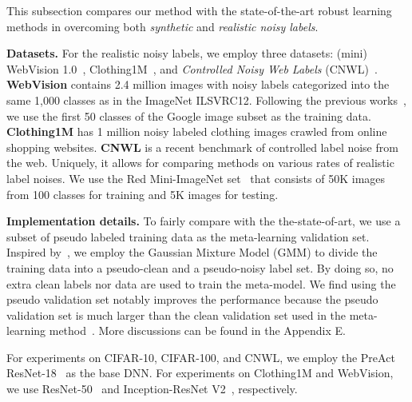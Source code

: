 \documentclass[final]{cvpr}
\begin{document}
This subsection compares our method with the state-of-the-art robust learning methods in overcoming both \textit{synthetic} and \textit{realistic noisy labels}.

\textbf{Datasets.} For the realistic noisy labels, we employ three datasets: (mini) WebVision 1.0~\cite{li2017webvision},  Clothing1M~\cite{xiao2015learning}, and \textit{Controlled Noisy Web Labels} (CNWL)~\cite{jiang2020beyond}. \textbf{WebVision} contains 2.4 million images with noisy labels categorized into the same 1,000 classes as in the ImageNet ILSVRC12. Following the previous works~\cite{jiang2017mentornet, chen2019understanding}, we use the first 50 classes of the Google image subset as the training data. 
\textbf{Clothing1M} has 1 million noisy labeled clothing images crawled from online shopping websites. \textbf{CNWL} is a recent benchmark of controlled label noise from the web. Uniquely, it allows for comparing methods on various rates of realistic label noises. We use the Red Mini-ImageNet set~\cite{vinyals2016matching} that consists of 50K images from 100 classes for training and 5K images for testing. 

\textbf{Implementation details.} To fairly compare with the the-state-of-art, we use a subset of pseudo labeled training data as the meta-learning validation set. Inspired by~\cite{li2020dividemix}, we employ the Gaussian Mixture Model (GMM) to divide the training data into a pseudo-clean and a pseudo-noisy label set. 
By doing so, no extra clean labels nor data are used to train the meta-model. We find using the pseudo validation set notably improves the performance because the pseudo validation set is much larger than the clean validation set used in the meta-learning method~\cite{shu2019meta}. 
More discussions can be found in the Appendix E.


For experiments on CIFAR-10, CIFAR-100, and CNWL, we employ the PreAct ResNet-18~\cite{he2016identity} as the base DNN. For experiments on Clothing1M and WebVision, we use ResNet-50~\cite{he2016deep} and Inception-ResNet V2~\cite{szegedy2016inception}, respectively. 
\end{document}
